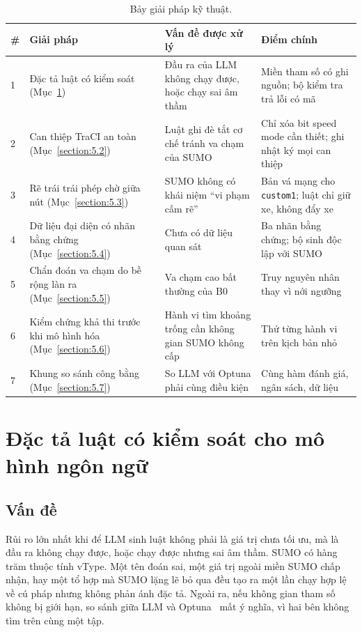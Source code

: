 \documentclass[../main.tex]{subfiles}
\begin{document}
\begin{table}[ht]
\centering
\small
\caption{Bảy giải pháp kỹ thuật.} \label{table:5.0}
\begin{tabular}{|p{0.6cm}|p{3.6cm}|p{4.6cm}|p{5.2cm}|}
\hline
\textbf{\#} & \textbf{Giải pháp} & \textbf{Vấn đề được xử lý} & \textbf{Điểm chính} \\ \hline
1 & Đặc tả luật có kiểm soát (Mục~\ref{section:5.1}) & Đầu ra của LLM không chạy được, hoặc chạy sai âm thầm & Miền tham số có ghi nguồn; bộ kiểm tra trả lỗi có mã \\ \hline
2 & Can thiệp TraCI an toàn (Mục~\ref{section:5.2}) & Luật ghi đè tắt cơ chế tránh va chạm của SUMO & Chỉ xóa bit speed mode cần thiết; ghi nhật ký mọi can thiệp \\ \hline
3 & Rẽ trái trái phép chờ giữa nút (Mục~\ref{section:5.3}) & SUMO không có khái niệm ``vi phạm cấm rẽ'' & Bản vá mạng cho \texttt{custom1}; luật chỉ giữ xe, không đẩy xe \\ \hline
4 & Dữ liệu đại diện có nhãn bằng chứng (Mục~\ref{section:5.4}) & Chưa có dữ liệu quan sát & Ba nhãn bằng chứng; bộ sinh độc lập với SUMO \\ \hline
5 & Chẩn đoán va chạm do bề rộng làn ra (Mục~\ref{section:5.5}) & Va chạm cao bất thường của B0 & Truy nguyên nhân thay vì nới ngưỡng \\ \hline
6 & Kiểm chứng khả thi trước khi mô hình hóa (Mục~\ref{section:5.6}) & Hành vi tìm khoảng trống cần không gian SUMO không cấp & Thử từng hành vi trên kịch bản nhỏ \\ \hline
7 & Khung so sánh công bằng (Mục~\ref{section:5.7}) & So LLM với Optuna phải cùng điều kiện & Cùng hàm đánh giá, ngân sách, dữ liệu \\ \hline
\end{tabular}
\end{table}

\section{Đặc tả luật có kiểm soát cho mô hình ngôn ngữ}
\label{section:5.1}

\subsection{Vấn đề}

Rủi ro lớn nhất khi để LLM sinh luật không phải là giá trị chưa tối ưu, mà là đầu ra không chạy được, hoặc chạy được nhưng sai âm thầm. SUMO có hàng trăm thuộc tính vType. Một tên đoán sai, một giá trị ngoài miền SUMO chấp nhận, hay một tổ hợp mà SUMO lặng lẽ bỏ qua đều tạo ra một lần chạy hợp lệ về cú pháp nhưng không phản ánh đặc tả. Ngoài ra, nếu không gian tham số không bị giới hạn, so sánh giữa LLM và Optuna~\cite{akiba2019optuna} mất ý nghĩa, vì hai bên không tìm trên cùng một tập.
\end{document}
